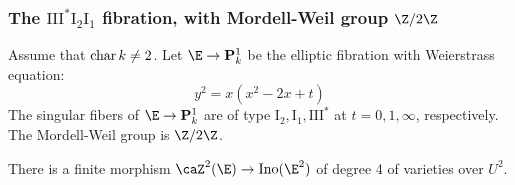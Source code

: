 \documentclass{article}
\DeclareMathOperator{\car}{{\rm char}}
\def\P{\mathbf{P}}
\newcommand{\Ino}{\operatorname{{Ino}}}
\newcommand{\III}{\mathrm{III}}
\newcommand{\I}{\mathrm{I}}
\begin{document}
\subsubsection{The $\III^{*}\I_2\I_1$ fibration, with Mordell-Weil group $\Z/2\Z$}\label{subsec:III*}
Assume that $\car k\neq 2$.  
Let $\E\to \P^1_k$ be the elliptic fibration with Weierstrass equation:
\begin{equation}
\label{EqEIII}
y^2 = x(x^2-2x+t) 
\end{equation}
The singular fibers of $\E\to\P^1_k$ are of type $\I_2,\I_1,\III^\ast$ at $t=0,1,\infty$, respectively.  The Mordell-Weil group is $\Z/2\Z$.

\begin{prop} There is a finite morphism $\caZ^2(\E)\to \Ino(\E^2)$ of degree 4 of varieties over $U^2$.
\end{prop}
\end{document}
